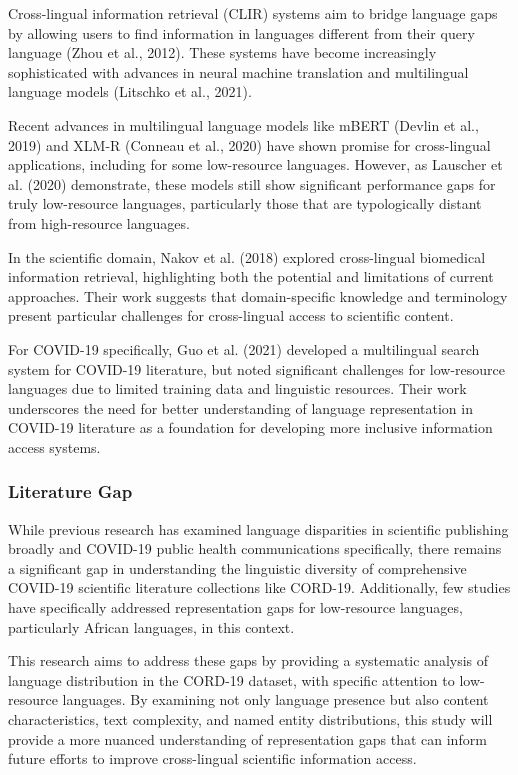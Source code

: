 \documentclass[
]{article}
\begin{document}
Cross-lingual information retrieval (CLIR) systems aim to bridge
language gaps by allowing users to find information in languages
different from their query language (Zhou et al., 2012). These systems
have become increasingly sophisticated with advances in neural machine
translation and multilingual language models (Litschko et al., 2021).

Recent advances in multilingual language models like mBERT (Devlin et
al., 2019) and XLM-R (Conneau et al., 2020) have shown promise for
cross-lingual applications, including for some low-resource languages.
However, as Lauscher et al. (2020) demonstrate, these models still show
significant performance gaps for truly low-resource languages,
particularly those that are typologically distant from high-resource
languages.

In the scientific domain, Nakov et al. (2018) explored cross-lingual
biomedical information retrieval, highlighting both the potential and
limitations of current approaches. Their work suggests that
domain-specific knowledge and terminology present particular challenges
for cross-lingual access to scientific content.

For COVID-19 specifically, Guo et al. (2021) developed a multilingual
search system for COVID-19 literature, but noted significant challenges
for low-resource languages due to limited training data and linguistic
resources. Their work underscores the need for better understanding of
language representation in COVID-19 literature as a foundation for
developing more inclusive information access systems.

\subsubsection{Literature Gap}\label{literature-gap}

While previous research has examined language disparities in scientific
publishing broadly and COVID-19 public health communications
specifically, there remains a significant gap in understanding the
linguistic diversity of comprehensive COVID-19 scientific literature
collections like CORD-19. Additionally, few studies have specifically
addressed representation gaps for low-resource languages, particularly
African languages, in this context.

This research aims to address these gaps by providing a systematic
analysis of language distribution in the CORD-19 dataset, with specific
attention to low-resource languages. By examining not only language
presence but also content characteristics, text complexity, and named
entity distributions, this study will provide a more nuanced
understanding of representation gaps that can inform future efforts to
improve cross-lingual scientific information access.
\end{document}
